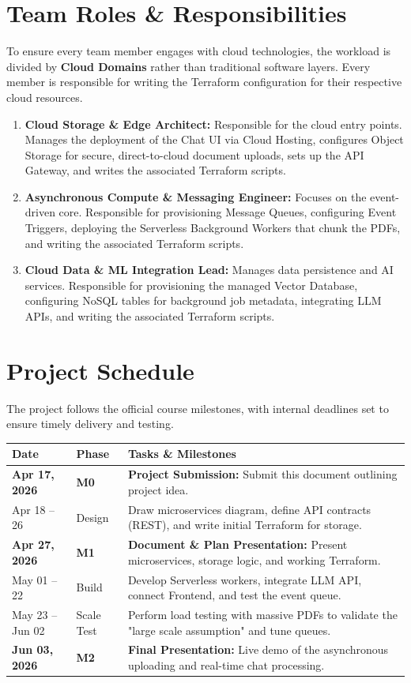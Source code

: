 \documentclass[12pt,a4paper]{article}
\begin{document}
\section{Team Roles \& Responsibilities}
To ensure every team member engages with cloud technologies, the workload is divided by \textbf{Cloud Domains} rather than traditional software layers. Every member is responsible for writing the Terraform configuration for their respective cloud resources.

\begin{enumerate}
    \item \textbf{Cloud Storage \& Edge Architect:} Responsible for the cloud entry points. Manages the deployment of the Chat UI via Cloud Hosting, configures Object Storage for secure, direct-to-cloud document uploads, sets up the API Gateway, and writes the associated Terraform scripts.
    \item \textbf{Asynchronous Compute \& Messaging Engineer:} Focuses on the event-driven core. Responsible for provisioning Message Queues, configuring Event Triggers, deploying the Serverless Background Workers that chunk the PDFs, and writing the associated Terraform scripts.
    \item \textbf{Cloud Data \& ML Integration Lead:} Manages data persistence and AI services. Responsible for provisioning the managed Vector Database, configuring NoSQL tables for background job metadata, integrating LLM APIs, and writing the associated Terraform scripts.
\end{enumerate}

\section{Project Schedule}
The project follows the official course milestones, with internal deadlines set to ensure timely delivery and testing.

\vspace{0.5cm}
\noindent
\begin{tabularx}{\textwidth}{@{} l l X @{}}
\toprule
\textbf{Date} & \textbf{Phase} & \textbf{Tasks \& Milestones} \\
\midrule
\textbf{Apr 17, 2026} & \textbf{M0} & \textbf{Project Submission:} Submit this document outlining project idea. \\
\addlinespace
Apr 18 -- 26 & Design & Draw microservices diagram, define API contracts (REST), and write initial Terraform for storage. \\
\addlinespace
\textbf{Apr 27, 2026} & \textbf{M1} & \textbf{Document \& Plan Presentation:} Present microservices, storage logic, and working Terraform. \\
\addlinespace
May 01 -- 22 & Build & Develop Serverless workers, integrate LLM API, connect Frontend, and test the event queue. \\
\addlinespace
May 23 -- Jun 02 & Scale Test & Perform load testing with massive PDFs to validate the "large scale assumption" and tune queues. \\
\addlinespace
\textbf{Jun 03, 2026} & \textbf{M2} & \textbf{Final Presentation:} Live demo of the asynchronous uploading and real-time chat processing. \\
\bottomrule
\end{tabularx}
\end{document}
